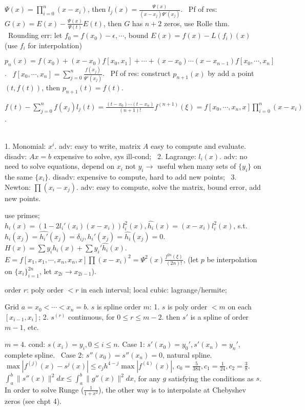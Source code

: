  $\Psi(x) = \prod_{i=0}^{n}(x-x_i)$, then $l_j(x) = \frac{\Psi(x)}{(x-x_j)\Psi'(x_j)}$. ~Pf of res: $G(x) = E(x)-\frac{\Psi(x)}{\Psi(t)}E(t)$, then $G$ has $n+2$ zeros, use Rolle thm. ~Rounding err: let $f_0 = f(x_0)-\epsilon,\cdots $, bound $E(x) = f(x) - L(f_i)(x)$ (use $f_i $ for interpolation)

 $p_n(x) = f(x_0)+(x-x_0)f[x_0,x_1]+\cdots + (x-x_0)\cdots(x-x_{n-1})f[x_0,\cdots, x_n] $. ~$f[x_0,\cdots, x_n] = \sum_{j=0}^{n}\frac{f(x_j)}{\Psi'(x_j)}$. ~Pf of res: construct $p_{n+1}(x) $ by add a point $(t, f(t))$, then $p_{n+1}(t) = f(t) $.

 $f(t)- \sum_{j=0}^{n}f(x_j)l_j(t)  = \frac{(t-x_0)\cdots(t-x_n)}{(n+1)!}f^{(n+1)}(\xi) = f[x_0, \cdots, x_n, x]\prod_{i=0}^{n}(x-x_i)$.

 \\[3pt]

 1. Monomial: $x^i $. adv: easy to write, matrix $A$ easy to compute and evaluate. disadv: $Ax=b$ expensive to solve, sys ill-cond; ~2. Lagrange: $l_i(x) $. adv: no need to solve equations, depend on $x_i $ not $y_i \to$ useful when many sets of $\{y_i\}$ on the same $\{x_i\}$. disadv: expensive to compute, hard to add new points; ~3. Newton: $\prod(x_i-x_j)$. adv: easy to compute, solve the matrix, bound error, add new points.

 use primes; $h_i(x) = (1-2l_i'(x_i)(x-x_i))l_i^2(x), \hat{h_i}(x) = (x-x_i)l_i^2(x) $, s.t. $h_i(x_j)=\hat{h_i'}(x_j) = \delta_{ij}, h_i'(x_j) = \hat{h_i}(x_j) = 0 $. ~$H(x) = \sum y_ih_i(x)+\sum y_i'\hat{h_i}(x) $. ~ $E = f[x_1, x_1, \cdots, x_n, x_n, x]\prod(x-x_i)^2 = \Psi^2(x)\frac{f^{2n}(\xi)}{(2n)!}$, (let $p$ be interpolation on $\{x_i\}_{i=1}^{2n} $, let $x_{2i}\to x_{2i-1} $).

 order $r$: poly order $< r$ in each interval; local cubic: lagrange/hermite;

 Grid $a = x_0<\cdots<x_n = b $. $s$ is spline order $m$: 1. $s$ is poly order $<m$ on each $[x_{i-1}, x_i]$; 2. $s^{(r)} $ continuous, for $0\le r\le m-2$. then $s'$ is a spline of order $m-1$, etc. 

 $m=4$. cond: $s(x_i) = y_i, 0\le i\le n $. Case 1: $s'(x_0) = y_0', s'(x_n) = y_n' $, complete spline. ~Case 2: $s''(x_0) = s''(x_n) = 0$, natural spline.  $\max|f^{(j)}(x)-s^{j}(x)|\le c_jh^{4-j}\max|f^{(4)}(x)| $, $c_0 = \frac{5}{384}, c_1 = \frac{1}{24}, c_2 = \frac{3}{8}. $ ~$\int_{a}^{b}\lVert s''(x)\rVert^2dx\le\int_{a}^{b}\lVert g''(x)\rVert^2dx $, for any $g$ satisfying the conditions as $s$. In order to solve Runge ($\frac{1}{1+x^2}$), the other way is to interpolate at Chebyshev zeros (see chpt 4).

